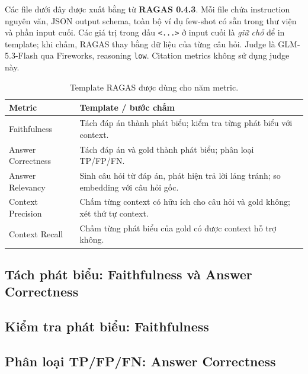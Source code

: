 Các file dưới đây được xuất bằng 
từ \textbf{RAGAS 0.4.3}. Mỗi file chứa instruction nguyên văn, JSON output
schema, toàn bộ ví dụ few-shot có sẵn trong thư viện và phần input cuối. Các
giá trị trong dấu \texttt{<...>} ở input cuối là \emph{giữ chỗ} để in template;
khi chấm, RAGAS thay bằng dữ liệu của từng câu hỏi. Judge là GLM-5.3-Flash qua
Fireworks, reasoning \texttt{low}. Citation metrics không sử dụng judge này.

\begin{table}[H]
  \centering
  \caption{Template RAGAS được dùng cho năm metric.}
  \small
  \begin{tabularx}{\textwidth}{@{}p{38mm}X@{}}
    \toprule
    \textbf{Metric} & \textbf{Template / bước chấm} \\
    \midrule
    Faithfulness & Tách đáp án thành phát biểu; kiểm tra từng phát biểu với context. \\
    Answer Correctness & Tách đáp án và gold thành phát biểu; phân loại TP/FP/FN. \\
    Answer Relevancy & Sinh câu hỏi từ đáp án, phát hiện trả lời lảng tránh; so embedding với câu hỏi gốc. \\
    Context Precision & Chấm từng context có hữu ích cho câu hỏi và gold không; xét thứ tự context. \\
    Context Recall & Chấm từng phát biểu của gold có được context hỗ trợ không. \\
    \bottomrule
  \end{tabularx}
\end{table}

\subsection*{Tách phát biểu: Faithfulness và Answer Correctness}


\subsection*{Kiểm tra phát biểu: Faithfulness}


\subsection*{Phân loại TP/FP/FN: Answer Correctness}


